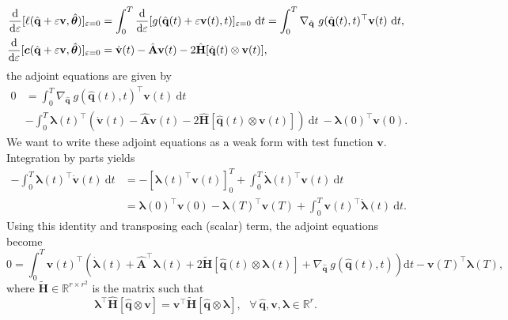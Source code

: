 \begin{align*}
    \dv{}{\varepsilon}[\mathcal{\ell}(\hat{\mathbf{q}}+\varepsilon \mathbf{v},\hat{\bm{\theta}})]_{\varepsilon=0} &= \int_0^T \dv{}{\varepsilon}[g(\hat{\mathbf{q}}(t)+\varepsilon \mathbf{v}(t),t)]_{\varepsilon=0}~\mathrm{d}t = \int_0^T \nabla_{\hat{\mathbf{q}}}~g(\hat{\mathbf{q}}(t),t)^{\top}\mathbf{v}(t)~\mathrm{d}t,\\
    \dv{}{\varepsilon}[\boldsymbol{c}(\hat{\mathbf{q}}+\varepsilon \mathbf{v},\hat{\bm{\theta}})]_{\varepsilon=0} &= \dot{\mathbf{v}}(t) - \hat{\mathbf{A}}\mathbf{v}(t) - 2\hat{\mathbf{H}}[\hat{\mathbf{q}}(t)\otimes \mathbf{v}(t)],
\end{align*}
the adjoint equations are given by\\
\begin{align*}
    0 &= \int_0^T \nabla_{\hat{\mathbf{q}}}~g(\hat{\mathbf{q}}(t),t)^{\top}\mathbf{v}(t)~\mathrm{d}t\\
    &- \int_0^T \bm{\lambda}(t)^{\top} \left( \dot{\mathbf{v}}(t) - \hat{\mathbf{A}}\mathbf{v}(t) - 2\hat{\mathbf{H}}[\hat{\mathbf{q}}(t)\otimes \mathbf{v}(t)] \right)~\mathrm{d}t~- \bm{\lambda}(0)^{\top}\mathbf{v}(0). 
\end{align*}
We want to write these adjoint equations as a weak form with test function $\mathbf{v}$. Integration by parts yields\\
\begin{align*}
    -\int_0^T\bm{\lambda}(t)^{\top} \dot{\mathbf{v}}(t)~\mathrm{d}t &= -\left[ \bm{\lambda}(t)^{\top} \mathbf{v}(t) \right]_0^T + \int_0^T \dot{\bm{\lambda}}(t)^{\top}\mathbf{v}(t)~\mathrm{d}t\\
    &= \bm{\lambda}(0)^{\top} \mathbf{v}(0) - \bm{\lambda}(T)^{\top} \mathbf{v}(T) + \int_0^T \mathbf{v}(t)^{\top}\dot{\bm{\lambda}}(t)~\mathrm{d}t.
\end{align*}
Using this identity and transposing each (scalar) term, the adjoint equations become\\
\begin{equation*}
    0 = \int_0^T \mathbf{v}(t)^{\top} \left( \dot{\bm{\lambda}}(t) + \hat{\mathbf{A}}^{\top} \bm{\lambda}(t) + 2\tilde{\mathbf{H}}[\hat{\mathbf{q}}(t)\otimes \bm{\lambda}(t)] + \nabla_{\hat{\mathbf{q}}}~g(\hat{\mathbf{q}}(t),t) \right)\mathrm{d}t - \mathbf{v}(T)^{\top}\bm{\lambda}(T), 
\end{equation*}
where $\tilde{\mathbf{H}}\in\mathbb{R}^{r\times r^2}$ is the matrix such that\\
$$\bm{\lambda}^{\top}\hat{\mathbf{H}}[\hat{\mathbf{q}}\otimes \mathbf{v}] = \mathbf{v}^{\top}\tilde{\mathbf{H}}[\hat{\mathbf{q}}\otimes \bm{\lambda}],~~~\forall~\hat{\mathbf{q}}, \mathbf{v}, \bm{\lambda} \in \mathbb{R}^r.$$
